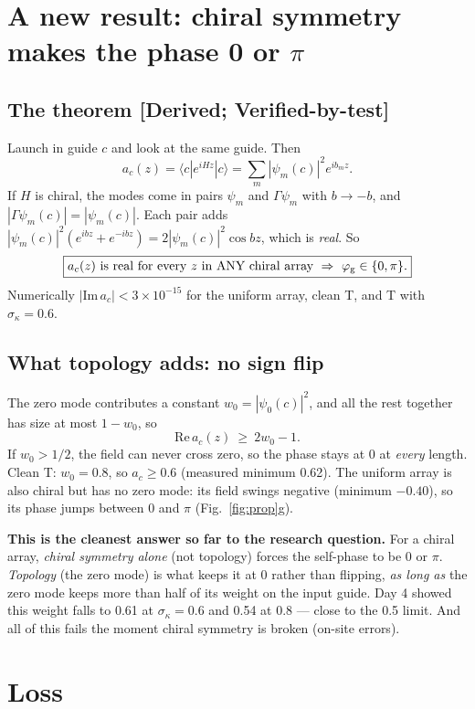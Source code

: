 \documentclass[10pt,a4paper]{article}
\newcommand{\note}[1]{\par\smallskip\noindent\colorbox{gray!12}{\parbox{\dimexpr\linewidth-2\fboxsep}{\small #1}}\par\smallskip}
\newcommand{\evd}[1]{\textsf{\small[#1]}}
\begin{document}
\section{A new result: chiral symmetry makes the phase 0 or $\pi$}
\subsection{The theorem \evd{Derived; Verified-by-test}}
Launch in guide $c$ and look at the same guide. Then
\[
a_c(z)=\langle c|e^{iHz}|c\rangle=\sum_m|\psi_m(c)|^2e^{ib_mz}.
\]
If $H$ is chiral, the modes come in pairs $\psi_m$ and $\Gamma\psi_m$ with $b\to-b$, and $|\Gamma\psi_m(c)|=|\psi_m(c)|$. Each pair adds $|\psi_m(c)|^2(e^{ibz}+e^{-ibz})=2|\psi_m(c)|^2\cos bz$, which is \emph{real}. So
\[
\boxed{a_c(z)\ \text{is real for every }z\text{ in ANY chiral array}\ \Rightarrow\ \varphi_{\rm g}\in\{0,\pi\}.}
\]
Numerically $|\mathrm{Im}\,a_c|<3\times10^{-15}$ for the uniform array, clean T, and T with $\sigma_\kappa=0.6$.

\subsection{What topology adds: no sign flip}
The zero mode contributes a constant $w_0=|\psi_0(c)|^2$, and all the rest together has size at most $1-w_0$, so
\[
\mathrm{Re}\,a_c(z)\ \ge\ 2w_0-1 .
\]
If $w_0>1/2$, the field can never cross zero, so the phase stays at 0 at \emph{every} length. Clean T: $w_0=0.8$, so $a_c\ge0.6$ (measured minimum 0.62). The uniform array is also chiral but has no zero mode: its field swings negative (minimum $-0.40$), so its phase jumps between 0 and $\pi$ (Fig.~\ref{fig:prop}g).
\note{\textbf{This is the cleanest answer so far to the research question.} For a chiral array, \emph{chiral symmetry alone} (not topology) forces the self-phase to be 0 or $\pi$. \emph{Topology} (the zero mode) is what keeps it at 0 rather than flipping, \emph{as long as} the zero mode keeps more than half of its weight on the input guide. Day 4 showed this weight falls to 0.61 at $\sigma_\kappa=0.6$ and 0.54 at 0.8 --- close to the 0.5 limit. And all of this fails the moment chiral symmetry is broken (on-site errors).}

\section{Loss}
\end{document}
